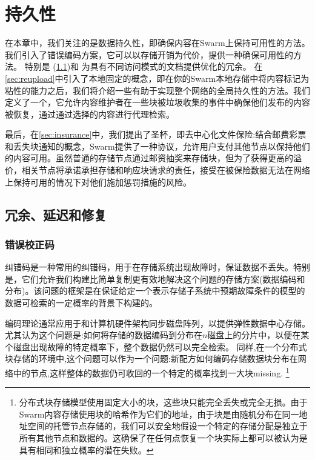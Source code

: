 \chapter{持久性\statusgreen}\label{sec:persistence}


在本章中，我们关注的是数据持久性，即确保内容在Swarm上保持可用性的方法。 
我们引入了错误编码方案，它可以以存储开销为代价，提供一种确保可用性的方法。 
特别是 (\ref{sec:repair})和 %
为具有不同访问模式的文档提供优化的冗余。
在\ref{sec:reupload}中引入了本地固定的概念，即在你的Swarm本地存储中将内容标记为粘性的能力之后，我们将介绍一些有助于实现整个网络的全局持久性的方法。我们定义了一个，它允许内容维护者在一些块被垃圾收集的事件中确保他们发布的内容被恢复，通过通过选择的内容进行代理检索。

最后，在\ref{sec:insurance}中，我们提出了圣杯，即去中心化文件保险:结合邮费彩票和丢失块通知的概念，Swarm提供了一种协议，允许用户支付其他节点以保持他们的内容可用。虽然普通的存储节点通过邮资抽奖来存储块，但为了获得更高的溢价，相关节点将承诺承担存储和响应块请求的责任，接受在被保险数据无法在网络上保持可用的情况下对他们施加惩罚措施的风险。


\section{冗余、延迟和修复\statusgreen}\label{sec:repair}

\green{}

\subsection{错误校正码}\label{sec:error-correcting-codes}

纠错码是一种常用的纠错码，用于在存储系统出现故障时，保证数据不丢失。特别是，它们允许我们构建比简单复制更有效地解决这个问题的存储方案(数据编码和分布)。该问题的框架是在保证给定一个表示存储子系统中预期故障条件的模型的数据可检索的一定概率的背景下构建的。

编码理论通常应用于和计算机硬件架构同步磁盘阵列，以提供弹性数据中心存储。
尤其认为这个问题是:如何将存储的数据编码到分布在$n$磁盘上的分片中，以便在某个磁盘出现故障的特定概率下，整个数据仍然可以完全检索。
同样,在一个分布式块存储的环境中,这个问题可以作为一个问题:新配方如何编码存储数据块分布在网络中的节点,这样整体的数据仍可收回的一个特定的概率找到一大块missing. %
%
\footnote{分布式块存储模型使用固定大小的块，这些块只能完全丢失或完全无损。由于Swarm内容存储使用块的哈希作为它们的地址，由于块是由随机分布在同一地址空间的托管节点存储的，我们可以安全地假设一个特定的存储分配是独立于所有其他节点和数据的。这确保了在任何点恢复一个块实际上都可以被认为是具有相同和独立概率的潜在失败。}

